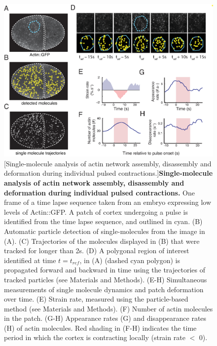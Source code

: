 \documentclass{ucetd}
\begin{document}
\begin{figure}[!htbp]
\centering
\includegraphics[width=1\textwidth]{Figure2-2}
[Single-molecule analysis of actin network assembly, disassembly and deformation during individual pulsed contractions.]{\textbf{Single-molecule analysis of actin network assembly, disassembly and deformation during individual pulsed contractions.} One frame of a time lapse sequence taken from an embryo expressing low levels of Actin::GFP. A patch of cortex undergoing a pulse is identified from the time lapse sequence, and outlined in cyan. (B) Automatic particle detection of single-molecules from the image in (A). (C) Trajectories of the molecules displayed in (B) that were tracked for longer than 2s. (D) A polygonal region of interest identified at time \(t = t_{ref}\), in (A) (dashed cyan polygon) is propagated forward and backward in time using the trajectories of tracked particles (see Materials and Methods). (E-H) Simultaneous measurements of single molecule dynamics and patch deformation over time. (E) Strain rate, measured using the particle-based method (see Materials and Methods). (F) Number of actin molecules in the patch. (G-H) Appearance rates (G) and disappearance rates (H) of actin molecules. Red shading in (F-H) indicates the time period in which the cortex is contracting locally (strain rate \(<\) 0).}
\end{figure}
\end{document}
